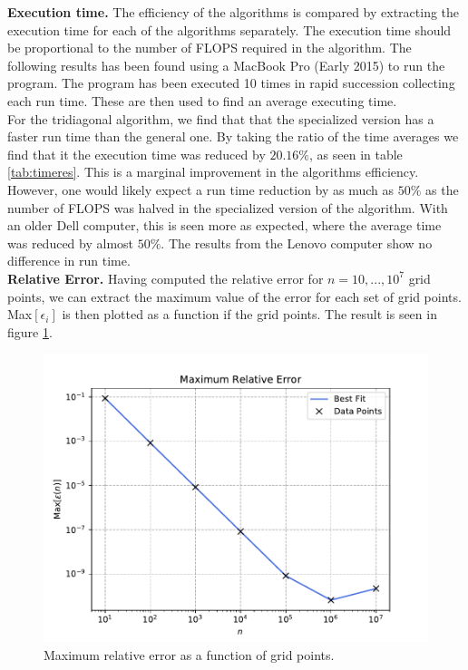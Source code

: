 \documentclass[a4paper,10pt]{article}
\begin{document}
 \textbf{Execution time.}
The efficiency of the algorithms is compared by extracting the execution time for each of the algorithms separately. The execution time should be proportional to the number of FLOPS required in the algorithm. The following results has been found using a MacBook Pro (Early 2015) to run the program. The program has been executed 10 times in rapid succession collecting each run time. These are then used to find an average executing time.\\


For the tridiagonal algorithm, we find that that the specialized version has a faster run time than the general one. By taking the ratio of the time averages we find that it the execution time was reduced by $20.16\%$, as seen in table \ref{tab:timeres}. This is a marginal improvement in the algorithms efficiency. However, one would likely expect a run time reduction by as much as $50\%$ as the number of FLOPS was halved in the specialized version of the algorithm. With an older Dell computer, this is seen more as expected, where the average time was reduced by almost $50 \%$. The results from the Lenovo computer show no difference in run time.\\

 \textbf{Relative Error.}
Having computed the relative error for $n = 10, ..., 10^7$ grid points, we can extract the maximum value of the error for each set of grid points. Max$[\epsilon_i]$ is then plotted as a function if the grid points. The result is seen in figure \ref{fig:4}.

\begin{figure}[h]
  \centering
  \includegraphics[width=0.9\linewidth]{figures/rel_error_plot.pdf}
  \caption{Maximum relative error as a function of grid points.}
  \label{fig:4}
\end{figure}
\end{document}
